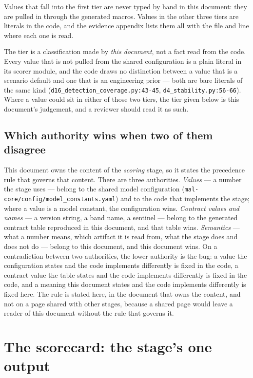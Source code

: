 \documentclass[11pt,a4paper]{article}
\newcommand{\code}[1]{\texttt{#1}}
\begin{document}
Values that fall into the first tier are never typed by hand in this
document: they are pulled in through the generated macros. Values in the
other three tiers are literals in the code, and the evidence appendix lists
them all with the file and line where each one is read.

The tier is a classification made by \emph{this document}, not a fact read
from the code. Every value that is not pulled from the shared configuration
is a plain literal in its scorer module, and the code draws no distinction
between a value that is a scenario default and one that is an engineering
prior --- both are bare literals of the same kind
(\code{d16\_detection\_coverage.py:43-45},
\code{d4\_stability.py:56-66}). Where a value could sit in either of those
two tiers, the tier given below is this document's judgement, and a reviewer
should read it as such.

\subsection{Which authority wins when two of them disagree}

This document owns the content of the \emph{scoring} stage, so it states
the precedence rule that governs that content. There are three authorities.
\emph{Values} --- a number the stage uses --- belong to the shared model
configuration (\code{mal-core/config/model\_constants.yaml}) and to the code
that implements the stage; where a value is a model constant, the
configuration wins. \emph{Contract values and names} --- a version string, a
band name, a sentinel --- belong to the generated contract table reproduced
in this document, and that table wins. \emph{Semantics} --- what a number
means, which artifact it is read from, what the stage does and does not do
--- belong to this document, and this document wins. On a contradiction
between two authorities, the lower authority is the bug: a value the
configuration states and the code implements differently is fixed in the
code, a contract value the table states and the code implements differently
is fixed in the code, and a meaning this document states and the code
implements differently is fixed here. The rule is stated here, in the
document that owns the content, and not on a page shared with other stages,
because a shared page would leave a reader of this document without the rule
that governs it.



\section{The scorecard: the stage's one output}
\end{document}
